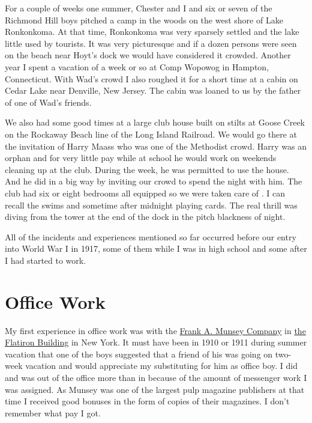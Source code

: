 \documentclass[12pt]{book}              %
\begin{document}
For a couple of weeks one summer, Chester and I and six or seven of the Richmond Hill boys pitched a camp in the woods on the west shore of Lake Ronkonkoma. At that time, Ronkonkoma was very sparsely settled and the lake little used by tourists. It was very picturesque and if a dozen persons were seen on the beach near Hoyt's dock we would have considered it crowded. Another year I spent a vacation of a week or so at Comp Wopowog in Hampton, Connecticut. With Wad's crowd I also roughed it for a short time at a cabin on Cedar Lake near Denville, New Jersey. The cabin was loaned to us by the father of one of Wad's friends. 

We also had some good times at a large club house built on stilts at Goose Creek on the Rockaway Beach line of the Long Island Railroad. We would go there at the invitation of Harry Maass who was one of the Methodist crowd. Harry was an orphan and for very little pay while at school he would work on weekends cleaning up at the club. During the week, he was permitted to use the house. And he did in a big way by inviting our crowd to spend the night with him. The club had six or eight bedrooms all equipped so we were taken care of . I can recall the swims and sometime after midnight playing cards. The real thrill was diving from the tower at the end of the dock in the pitch blackness of night. 

All of the incidents and experiences mentioned so far occurred before our entry into World War I in 1917, some of them while I was in high school and some after I had started to work.

\chapter{Office Work}

My first experience in office work was with the \href{http://en.wikipedia.org/wiki/Frank_Munsey}{Frank A. Munsey Company} in \href{http://en.wikipedia.org/wiki/Flatiron_Building}{the Flatiron Building} in New York. It must have been in 1910 or 1911 during summer vacation that one of the boys suggested that a friend of his was going on two-week vacation and would appreciate my substituting for him as office boy. I did and was out of the office more than in because of the amount of messenger work I was assigned. As Munsey was one of the largest pulp magazine publishers at that time I received good bonuses in the form of copies of their magazines. I don't remember what pay I got. 

\end{document}
